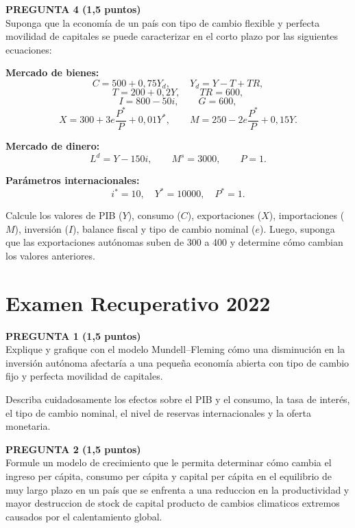 \documentclass[11pt,addpoints]{article}
\begin{document}
\vspace{0.4cm}

\textbf{PREGUNTA 4 (1,5 puntos)}\\[0.2cm]
Suponga que la economía de un país con tipo de cambio flexible y perfecta movilidad de capitales se puede caracterizar en el corto plazo por las siguientes ecuaciones:

\medskip
\textbf{Mercado de bienes:}
\[
C = 500 + 0{,}75Y_d, \qquad Y_d = Y - T + TR,
\]
\[
T = 200 + 0{,}2Y, \qquad TR = 600,
\]
\[
I = 800 - 50i, \qquad G = 600,
\]
\[
X = 300 + 3e\frac{P^*}{P} + 0{,}01Y^*, \qquad
M = 250 - 2e\frac{P^*}{P} + 0{,}15Y.
\]

\textbf{Mercado de dinero:}
\[
L^d = Y - 150i, \qquad M^s = 3000, \qquad P = 1.
\]

\newpage
\vspace*{0.5cm}

\textbf{Parámetros internacionales:}
\[
i^* = 10, \quad Y^* = 10000, \quad P^* = 1.
\]

\medskip
Calcule los valores de PIB ($Y$), consumo ($C$), exportaciones ($X$), importaciones ($M$), inversión ($I$), balance fiscal y tipo de cambio nominal ($e$). Luego, suponga que las exportaciones autónomas suben de 300 a 400 y determine cómo cambian los valores anteriores.


\section*{Examen Recuperativo 2022}


\textbf{PREGUNTA 1 (1,5 puntos)}\\[0.2cm]
Explique y grafique con el modelo Mundell–Fleming cómo una disminución en la inversión autónoma afectaría a una pequeña economía abierta con tipo de cambio fijo y perfecta movilidad de capitales.  

Describa cuidadosamente los efectos sobre el PIB y el consumo, la tasa de interés, el tipo de cambio nominal, el nivel de reservas internacionales y la oferta monetaria.

\vspace{0.4cm}

\textbf{PREGUNTA 2 (1,5 puntos)}\\[0.2cm]
Formule un modelo de crecimiento que le permita determinar cómo cambia el ingreso per cápita, consumo per cápita y capital per cápita en el equilibrio de muy largo plazo en un país que se enfrenta a una reduccion en la productividad y mayor destruccion de stock de capital producto de cambios climaticos extremos causados por el calentamiento global.
\vspace{0.4cm}
\end{document}
